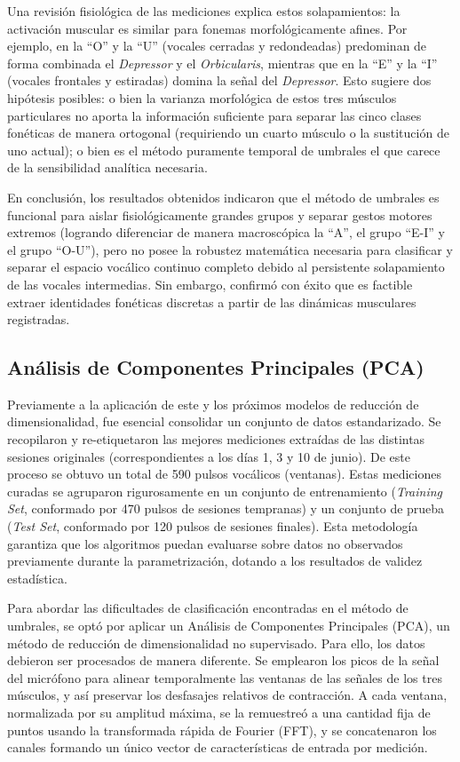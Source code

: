 Una revisión fisiológica de las mediciones explica estos solapamientos: la activación muscular es similar para fonemas morfológicamente afines. Por ejemplo, en la \enquote{O} y la \enquote{U} (vocales cerradas y redondeadas) predominan de forma combinada el \textit{Depressor} y el \textit{Orbicularis}, mientras que en la \enquote{E} y la \enquote{I} (vocales frontales y estiradas) domina la señal del \textit{Depressor}. Esto sugiere dos hipótesis posibles: o bien la varianza morfológica de estos tres músculos particulares no aporta la información suficiente para separar las cinco clases fonéticas de manera ortogonal (requiriendo un cuarto músculo o la sustitución de uno actual); o bien es el método puramente temporal de umbrales el que carece de la sensibilidad analítica necesaria. 

En conclusión, los resultados obtenidos indicaron que el método de umbrales es funcional para aislar fisiológicamente grandes grupos y separar gestos motores extremos (logrando diferenciar de manera macroscópica la \enquote{A}, el grupo \enquote{E-I} y el grupo \enquote{O-U}), pero no posee la robustez matemática necesaria para clasificar y separar el espacio vocálico continuo completo debido al persistente solapamiento de las vocales intermedias. Sin embargo, confirmó con éxito que es factible extraer identidades fonéticas discretas a partir de las dinámicas musculares registradas.

\subsection{Análisis de Componentes Principales (PCA)}

Previamente a la aplicación de este y los próximos modelos de reducción de dimensionalidad, fue esencial consolidar un conjunto de datos estandarizado. Se recopilaron y re-etiquetaron las mejores mediciones extraídas de las distintas sesiones originales (correspondientes a los días 1, 3 y 10 de junio). De este proceso se obtuvo un total de 590 pulsos vocálicos (ventanas). Estas mediciones curadas se agruparon rigurosamente en un conjunto de entrenamiento (\textit{Training Set}, conformado por 470 pulsos de sesiones tempranas) y un conjunto de prueba (\textit{Test Set}, conformado por 120 pulsos de sesiones finales). Esta metodología garantiza que los algoritmos puedan evaluarse sobre datos no observados previamente durante la parametrización, dotando a los resultados de validez estadística.

Para abordar las dificultades de clasificación encontradas en el método de umbrales, se optó por aplicar un Análisis de Componentes Principales (PCA), un método de reducción de dimensionalidad no supervisado. Para ello, los datos debieron ser procesados de manera diferente. Se emplearon los picos de la señal del micrófono para alinear temporalmente las ventanas de las señales de los tres músculos, y así preservar los desfasajes relativos de contracción. A cada ventana, normalizada por su amplitud máxima, se la remuestreó a una cantidad fija de puntos usando la transformada rápida de Fourier (FFT), y se concatenaron los canales formando un único vector de características de entrada por medición.

